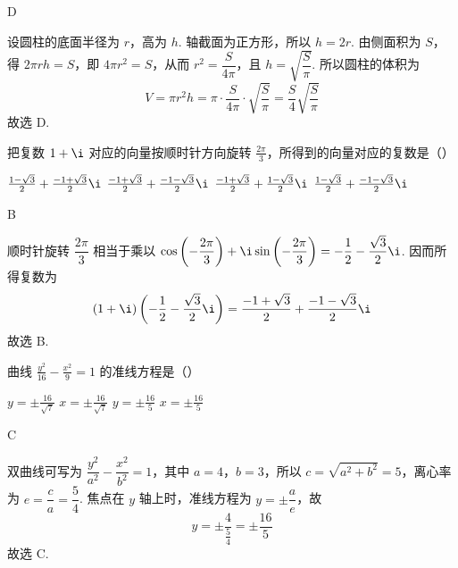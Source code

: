 \documentclass[UTF8,a4paper,oneside,11pt]{ctexbook}
\begin{document}
\begin{answer}D\end{answer}

\begin{solution}
设圆柱的底面半径为 \(r\)，高为 \(h\). 轴截面为正方形，所以 \(h=2r\). 由侧面积为 \(S\)，得 \(2\pi rh=S\)，即 \(4\pi r^2=S\)，从而 \(r^2=\dfrac{S}{4\pi}\)，且 \(h=\sqrt{\dfrac{S}{\pi}}\). 所以圆柱的体积为
\[
V=\pi r^2h=\pi\cdot\frac{S}{4\pi}\cdot\sqrt{\frac{S}{\pi}}=\frac{S}{4}\sqrt{\frac{S}{\pi}}
\]
故选 D.
\end{solution}


\begin{problem}
把复数 \(1+\i\) 对应的向量按顺时针方向旋转 \(\frac{2\pi}{3}\)，所得到的向量对应的复数是（\quad）

\choices
    {\(\frac{1-\sqrt{3}}{2}+\frac{-1+\sqrt{3}}{2}\i\)}
    {\(\frac{-1+\sqrt{3}}{2}+\frac{-1-\sqrt{3}}{2}\i\)}
    {\(\frac{-1+\sqrt{3}}{2}+\frac{1-\sqrt{3}}{2}\i\)}
    {\(\frac{1-\sqrt{3}}{2}+\frac{-1-\sqrt{3}}{2}\i\)}
\end{problem}

\begin{answer}B\end{answer}

\begin{solution}
顺时针旋转 \(\dfrac{2\pi}{3}\) 相当于乘以 \(\cos\left(-\dfrac{2\pi}{3}\right)+\i\sin\left(-\dfrac{2\pi}{3}\right)=-\dfrac12-\dfrac{\sqrt3}{2}\i\). 因而所得复数为
\[
(1+\i)\left(-\frac12-\frac{\sqrt3}{2}\i\right)=\frac{-1+\sqrt3}{2}+\frac{-1-\sqrt3}{2}\i
\]
故选 B.
\end{solution}


\begin{problem}
曲线 \(\frac{y^2}{16}-\frac{x^2}{9}=1\) 的准线方程是（\quad）

\choices
    {\(y=\pm \frac{16}{\sqrt{7}}\)}
    {\(x=\pm \frac{16}{\sqrt{7}}\)}
    {\(y=\pm \frac{16}{5}\)}
    {\(x=\pm \frac{16}{5}\)}
\end{problem}

\begin{answer}C\end{answer}

\begin{solution}
双曲线可写为 \(\dfrac{y^2}{a^2}-\dfrac{x^2}{b^2}=1\)，其中 \(a=4\)，\(b=3\)，所以 \(c=\sqrt{a^2+b^2}=5\)，离心率为 \(e=\dfrac{c}{a}=\dfrac54\). 焦点在 \(y\) 轴上时，准线方程为 \(y=\pm\dfrac{a}{e}\)，故
\[
y=\pm\frac{4}{\frac{5}{4}}=\pm\frac{16}{5}
\]
故选 C.
\end{solution}
\end{document}

